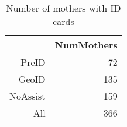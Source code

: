 \begin{table}[ht]
\centering
\begin{tabular}{rr}
  \hline
 & NumMothers \\ 
  \hline
PreID &  72 \\ 
  GeoID & 135 \\ 
  NoAssist & 159 \\ 
  All & 366 \\ 
   \hline
\end{tabular}
\caption{Number of mothers with ID cards} 
\end{table}
